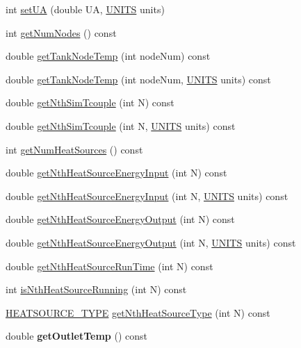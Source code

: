\begin{DoxyCompactItemize}
\item 
int \hyperlink{class_h_p_w_h_a303ac307093da4ef292dc88f946d677f}{set\-U\-A} (double U\-A, \hyperlink{class_h_p_w_h_a145320dbf116b9245ac4421026cff294}{U\-N\-I\-T\-S} units)
\item 
int \hyperlink{class_h_p_w_h_a38e4f7eb3da82c2281657702fc472b1d}{get\-Num\-Nodes} () const 
\item 
double \hyperlink{class_h_p_w_h_a440f55f294a28f9024ce4731f515b802}{get\-Tank\-Node\-Temp} (int node\-Num) const 
\item 
double \hyperlink{class_h_p_w_h_afac039cdb5bb3643eb46fdef08a88948}{get\-Tank\-Node\-Temp} (int node\-Num, \hyperlink{class_h_p_w_h_a145320dbf116b9245ac4421026cff294}{U\-N\-I\-T\-S} units) const 
\item 
double \hyperlink{class_h_p_w_h_a3fc011d8bc8302e62d45e8fc92d1ce3e}{get\-Nth\-Sim\-Tcouple} (int N) const 
\item 
double \hyperlink{class_h_p_w_h_a87a26a59001216562f01eed1a0b877fe}{get\-Nth\-Sim\-Tcouple} (int N, \hyperlink{class_h_p_w_h_a145320dbf116b9245ac4421026cff294}{U\-N\-I\-T\-S} units) const 
\item 
int \hyperlink{class_h_p_w_h_a3d41868f9f79e940f59eec10432a1aec}{get\-Num\-Heat\-Sources} () const 
\item 
double \hyperlink{class_h_p_w_h_a2c2d3a5cf77dcb66137d9f89d63b46df}{get\-Nth\-Heat\-Source\-Energy\-Input} (int N) const 
\item 
double \hyperlink{class_h_p_w_h_a81113be21e2d6704d3a9178393a40cbe}{get\-Nth\-Heat\-Source\-Energy\-Input} (int N, \hyperlink{class_h_p_w_h_a145320dbf116b9245ac4421026cff294}{U\-N\-I\-T\-S} units) const 
\item 
double \hyperlink{class_h_p_w_h_ae321e3dc14aab36ae225d49496624153}{get\-Nth\-Heat\-Source\-Energy\-Output} (int N) const 
\item 
double \hyperlink{class_h_p_w_h_a2eb42a19d26901e89f33dea5c4b3d6c9}{get\-Nth\-Heat\-Source\-Energy\-Output} (int N, \hyperlink{class_h_p_w_h_a145320dbf116b9245ac4421026cff294}{U\-N\-I\-T\-S} units) const 
\item 
double \hyperlink{class_h_p_w_h_add3696333342add793a2aeb5f3433dbd}{get\-Nth\-Heat\-Source\-Run\-Time} (int N) const 
\item 
int \hyperlink{class_h_p_w_h_a587a39a680823886348b489e85f243e9}{is\-Nth\-Heat\-Source\-Running} (int N) const 
\item 
\hyperlink{class_h_p_w_h_af01f392e3fff4013310d3fe992bb00bc}{H\-E\-A\-T\-S\-O\-U\-R\-C\-E\-\_\-\-T\-Y\-P\-E} \hyperlink{class_h_p_w_h_a0b5bc1354d20431d5e1f15e2c56ddefa}{get\-Nth\-Heat\-Source\-Type} (int N) const 
\item 
\hypertarget{class_h_p_w_h_af16099ea18a8c1c9f6025b7e2fc00e7e}{double {\bfseries get\-Outlet\-Temp} () const }\label{class_h_p_w_h_af16099ea18a8c1c9f6025b7e2fc00e7e}


\end{DoxyCompactItemize}

